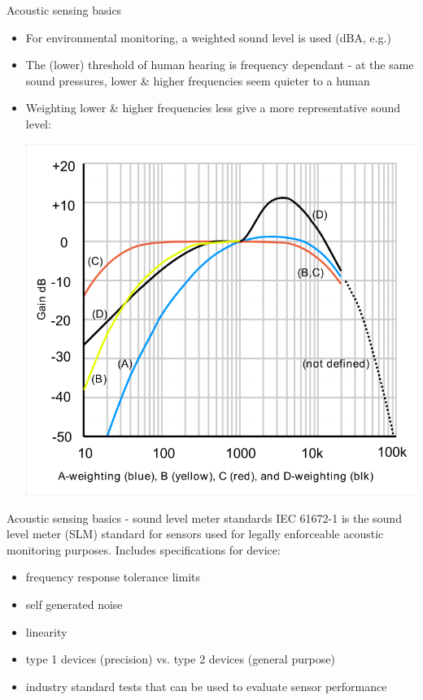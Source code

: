 \documentclass{beamer}
\begin{document}
    \begin{frame}{Acoustic sensing basics}
        \begin{itemize}
            \item For environmental monitoring, a weighted sound level is used (dBA, e.g.)
            \item The (lower) threshold of human hearing is frequency dependant - at the same sound pressures, lower \& higher frequencies seem quieter to a human
            \item Weighting lower \& higher frequencies less give a more representative sound level:
            \begin{center}
            \includegraphics[scale=0.175]{figures/acoustic_weighting_curves.png}
            \end{center}
            
        \end{itemize}
    \end{frame}
    
    \begin{frame}{Acoustic sensing basics - sound level meter standards}
        IEC 61672-1 is the sound level meter (SLM) standard for sensors used for legally enforceable acoustic monitoring purposes. Includes specifications for device:
        \begin{itemize}
            \item frequency response tolerance limits
            \item self generated noise
            \item linearity 
            \item type 1 devices (precision) vs. type 2 devices (general purpose)
            \item industry standard tests that can be used to evaluate sensor performance
        \end{itemize}
    \end{frame}
    
\end{document}
